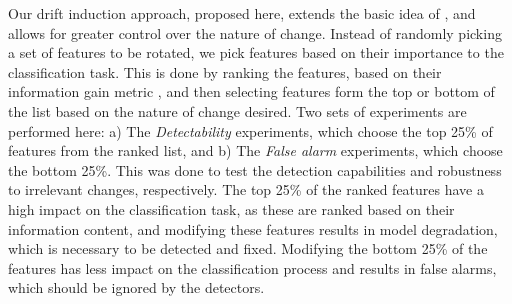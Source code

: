 \documentclass[authoryear,3p,times,twocolumn]{elsarticle}
\begin{document}
Our drift induction approach, proposed here, extends the basic idea of \citep{zliobaite2010change}, and allows for greater control over the nature of change. Instead of randomly picking a set of features to be rotated, we pick features based on their importance to the classification task. This is done by ranking the features, based on their information gain metric \citep{duch2004comparison}, and then selecting features form the top or bottom of the list based on the nature of change desired. Two sets of experiments are performed here: a) The \textit{Detectability} experiments, which choose the top 25\% of features from the ranked list, and b) The \textit{False alarm} experiments, which choose the bottom 25\%. This was done to test the detection capabilities and robustness to irrelevant changes, respectively. The top 25\% of the ranked features have a high impact on the classification task, as these are ranked based on their information content, and modifying these features results in model degradation, which is necessary to be detected and fixed. Modifying the bottom 25\% of the features has less impact on the classification process and results in false alarms, which should be ignored by the detectors. 


\begin{table}[t]
\centering
\caption{Effects of shuffling the top 25\% and the bottom 25\% feature, on the test accuracy.}
\label{tbl:induced_setup}
\end{table}
\end{document}
